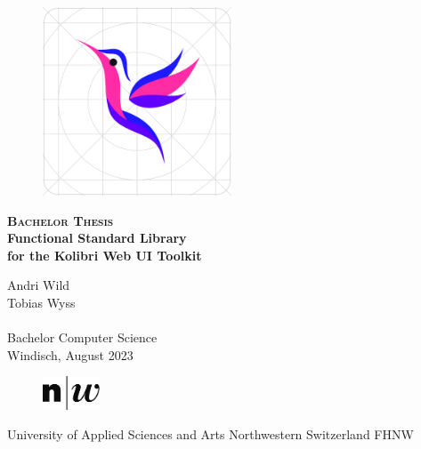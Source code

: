 






\begin{titlepage}
\begin{center}

    \begin{figure}[H]
        \centering
        \includegraphics[width=0.50\textwidth]{./frontmatter/pictures/kolibri-logo}
    \end{figure}
    \vspace*{1cm}
    {
      \huge \textsc \bfseries Bachelor Thesis
    }
    \vspace*{1cm}
    {
      \Huge \bfseries \\Functional Standard Library \\for the Kolibri Web UI Toolkit  \\ 
    }
    \vspace{1.5cm}
    {\large 
      Andri Wild\\
      Tobias Wyss\\
    	~\\
    	Bachelor Computer Science\\
    	\vspace{0.5cm}
    	Windisch, August 2023\\
    	\vspace{1.0cm}
    \begin{figure}[h]
        \centering
        \includegraphics[width=0.15\textwidth]{./frontmatter/pictures/fhnw_e_10mm.jpg}
    \end{figure}
    	University of Applied Sciences and Arts Northwestern Switzerland FHNW
        ~\\
    }


\end{center}
\end{titlepage}
